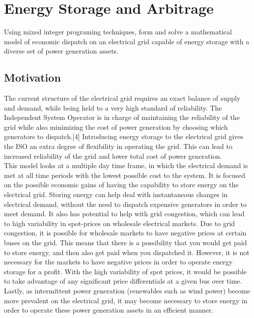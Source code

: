 \section{Energy Storage and Arbitrage}
Using mixed integer programing techniques, form and solve a mathematical model of economic
dispatch on an electrical grid capable of energy storage with a diverse set of power generation assets.

\subsection{Motivation}
The current structure of the electrical grid requires an exact balance of supply and demand,
while being held to a very high standard of reliability. The Independent System Operator is in charge of
maintaining the reliability of the grid while also minimizing the cost of power generation by choosing
which generators to dispatch.[4] Introducing energy storage to the electrical grid gives the ISO an extra
degree of flexibility in operating the grid. This can lead to increased reliability of the grid and lower total
cost of power generation. \\

This model looks at a multiple day time frame, in which the electrical demand is met at all time
periods with the lowest possible cost to the system. It is focused on the possible economic gains of
having the capability to store energy on the electrical grid. Storing energy can help deal with
instantaneous changes in electrical demand, without the need to dispatch expensive generators in order
to meet demand. It also has potential to help with grid congestion, which can lead to high variability in
spot-prices on wholesale electrical markets. Due to grid congestion, it is possible for wholesale markets
to have negative prices at certain buses on the grid. This means that there is a possibility that you would
get paid to store energy, and then also get paid when you dispatched it. However, it is not necessary for
the markets to have negative prices in order to operate energy storage for a profit. With the high
variability of spot prices, it would be possible to take advantage of any significant price differentials at a
given bus over time. Lastly, as intermittent power generation (renewables such as wind power) become
more prevalent on the electrical grid, it may become necessary to store energy in order to operate these
power generation assets in an efficient manner. \\

